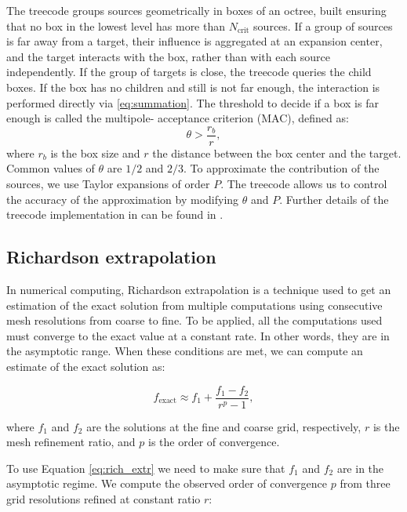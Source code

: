 The treecode groups sources geometrically in boxes of an octree, built ensuring
that no box in the lowest level has more than $N_\text{crit}$ sources. If a group of
sources is far away from a target, their influence is aggregated at an expansion center,
and the target interacts with the box, rather than with each source independently. If the group of targets is close, 
the treecode queries the child boxes. If the box has no children and still is not far enough, the interaction is 
performed directly via \eqref{eq:summation}. The threshold to decide if a box is far enough is called the multipole-
acceptance criterion (MAC), defined as:
%
\begin{equation}
\theta > \frac{r_b}{r},
\end{equation}
%
where $r_b$ is the box size and $r$ the distance between the box center and the target.
Common values of $\theta$ are $1/2$ and $2/3$.
To approximate the contribution of the sources, we use Taylor expansions
of order $P$.
The treecode allows us to control the accuracy of the approximation by modifying $\theta$ and $P$.
Further details of the treecode implementation in \pygbe can be found in \cite{CooperBarba-share154331,CooperBardhanBarba2013}.

\subsection{Richardson extrapolation} \label{sec:rich_extrapolation}

In numerical computing, Richardson extrapolation is a technique used to get an estimation
of the exact solution from multiple computations using consecutive mesh resolutions from coarse
to fine. To be applied, all the computations used must converge to the exact value
at a constant rate. In other words, they are in the asymptotic range. When these conditions are met,
we can compute an estimate of the exact solution as:

\begin{equation} \label{eq:rich_extr}
   f_{\text{exact}} \approx f_1 + \frac{f_1 - f_2}{r^{p} - 1},
\end{equation} 

where $f_1$ and $f_2$ are the solutions at the fine and coarse grid, respectively, 
$r$ is the mesh refinement ratio, and $p$ is the order of convergence.

To use Equation \eqref{eq:rich_extr} we need to make sure that $f_1$ and $f_2$ are in the 
asymptotic regime. We compute the observed order of convergence $p$ from three grid resolutions
refined at constant ratio $r$:

